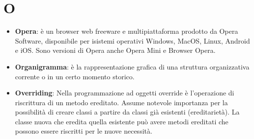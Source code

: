 \section{O}
\begin{itemize}
	\item
	\textbf{Opera}: è un browser web freeware e multipiattaforma prodotto da Opera Software, disponibile per isistemi operativi Windows, MacOS, Linux, Android e iOS. Sono versioni di Opera anche Opera Mini e Browser Opera.
	\item 
	\textbf{Organigramma}: è la rappresentazione grafica di una struttura organizzativa corrente o in un certo momento storico.
	\item
	\textbf{Overriding}: Nella programmazione ad oggetti override è l'operazione di riscrittura di un metodo ereditato. Assume notevole importanza per la possibilità di creare classi a partire da classi già esistenti (ereditarietà). La classe nuova che eredita quella esistente può avere metodi ereditati che possono essere riscritti per le nuove necessità.
\end{itemize}